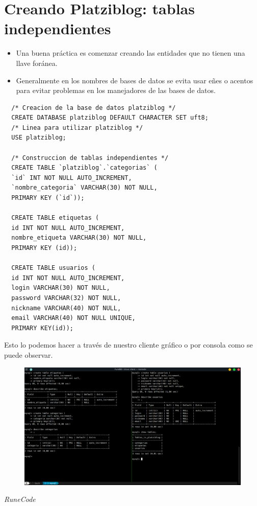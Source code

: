 \documentclass{article}
\begin{document}
\section{Creando Platziblog: tablas independientes}%
\begin{itemize}
  \item Una buena práctica es comenzar creando las entidades que no tienen una
    llave foránea.
  \item Generalmente en los nombres de bases de datos se evita usar eñes o
    acentos para evitar problemas en los manejadores de las bases de datos.
\end{itemize}

\begin{verbatim}
  /* Creacion de la base de datos platziblog */
  CREATE DATABASE platziblog DEFAULT CHARACTER SET uft8;
  /* Linea para utilizar platziblog */
  USE platziblog;
  
  /* Construccion de tablas independientes */
  CREATE TABLE `platziblog`.`categorias` (
  `id` INT NOT NULL AUTO_INCREMENT,
  `nombre_categoria` VARCHAR(30) NOT NULL,
  PRIMARY KEY (`id`));

  CREATE TABLE etiquetas (
  id INT NOT NULL AUTO_INCREMENT,
  nombre_etiqueta VARCHAR(30) NOT NULL,
  PRIMARY KEY (id));

  CREATE TABLE usuarios (
  id INT NOT NULL AUTO_INCREMENT,
  login VARCHAR(30) NOT NULL,
  password VARCHAR(32) NOT NULL,
  nickname VARCHAR(40) NOT NULL,
  email VARCHAR(40) NOT NULL UNIQUE,
  PRIMARY KEY(id));
\end{verbatim}

Esto lo podemos hacer a través de nuestro cliente gráfico o por consola como se puede observar.

\begin{figure}[h!]
  \centering
  \includegraphics[scale=0.50]{./Pictures/067_platziblog_ti.png}
\end{figure}





\vspace{2cm}
\LARGE\textit{RuneCode}
\end{document}
